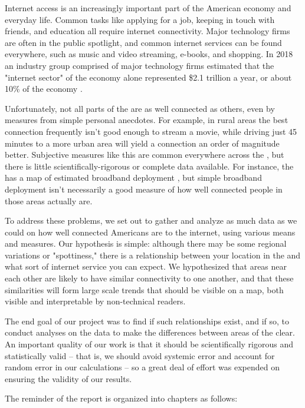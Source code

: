 Internet access is an increasingly important part of the American economy and everyday life. Common tasks like applying for a job, keeping in touch with friends, and education all require internet connectivity. Major technology firms are often in the public spotlight, and common internet services can be found everywhere, such as music and video streaming, e-books, and shopping. In 2018 an industry group comprised of major technology firms estimated that the "internet sector" of the economy alone represented \$2.1 trillion a year, or about 10\% of the \us economy \cite{Shepardson2019a}.

Unfortunately, not all parts of the \us are as well connected as others, even by measures from simple personal anecdotes. For example, in rural areas the best connection frequently isn't good enough to stream a movie, while driving just 45 minutes to a more urban area will yield a connection an order of magnitude better. Subjective measures like this are common everywhere across the \us, but there is little scientifically-rigorous or complete data available. For instance, the \fcc has a map of estimated broadband deployment \cite{FederalCommunicationsCommission}, but simple broadband deployment isn't necessarily a good measure of how well connected people in those areas actually are.

To address these problems, we set out to gather and analyze as much data as we could on how well connected Americans are to the internet, using various means and measures. Our hypothesis is simple: although there may be some regional variations or "spottiness," there is a relationship between your location in the \us and what sort of internet service you can expect. We hypothesized that areas near each other are likely to have similar connectivity to one another, and that these similarities will form large scale trends that should be visible on a map, both visible and interpretable by non-technical readers.

The end goal of our project was to find if such relationships exist, and if so, to conduct analyses on the data to make the differences between areas of the \us clear. An important quality of our work is that it should be scientifically rigorous and statistically valid -- that is, we should avoid systemic error and account for random error in our calculations -- so a great deal of effort was expended on ensuring the validity of our results.

The reminder of the report is organized into chapters as follows:

